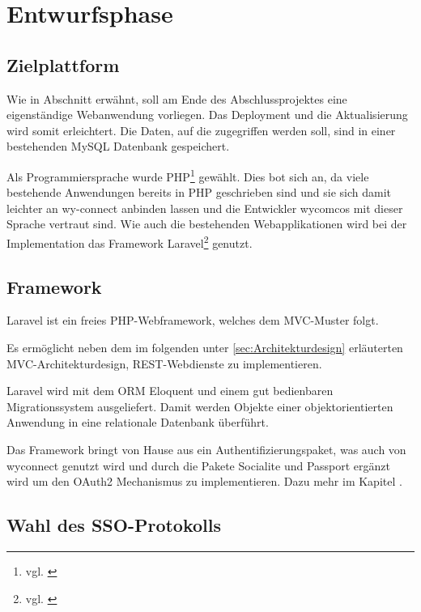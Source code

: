 \section{Entwurfsphase} 
\label{sec:Entwurfsphase}

\subsection{Zielplattform}
\label{sec:Zielplattform}

Wie in Abschnitt  erwähnt, soll am Ende des Abschlussprojektes eine eigenständige Webanwendung vorliegen. Das Deployment und die Aktualisierung wird somit erleichtert.
Die Daten, auf die zugegriffen werden soll, sind in einer bestehenden MySQL Datenbank gespeichert. 

Als Programmiersprache wurde \acs{PHP}\footnote{vgl. \cite{PHP}} gewählt. Dies bot sich an, da viele bestehende Anwendungen bereits in PHP geschrieben sind und sie sich damit leichter an wy-connect anbinden lassen und die Entwickler wycomcos mit dieser Sprache vertraut sind. 
Wie auch die bestehenden Webapplikationen wird bei der Implementation das Framework Laravel\footnote{vgl. \cite{Laravel}} genutzt.

\subsection{Framework}
\label{sec:Framework}

Laravel ist ein freies \acs{PHP}-Webframework, welches dem \acs{MVC}-Muster folgt. 

Es ermöglicht neben dem im folgenden unter \ref{sec:Architekturdesign} erläuterten MVC-Architekturdesign, \acs{REST}-Webdienste zu implementieren.

Laravel wird mit dem \acs{ORM} Eloquent und einem gut bedienbaren Migrationssystem ausgeliefert. Damit werden Objekte einer objektorientierten Anwendung in eine relationale Datenbank überführt.

Das Framework bringt von Hause aus ein Authentifizierungspaket, was auch von wyconnect genutzt wird und durch die Pakete Socialite und Passport ergänzt wird um den OAuth2 Mechanismus zu implementieren. Dazu mehr im Kapitel .

\subsection{Wahl des SSO-Protokolls}
\label{sec:Protokollwahl}

